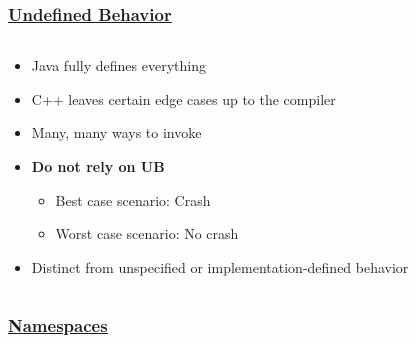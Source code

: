 \documentclass[glossy]{beamer}
\newcommand{\cppref}[2]{\href{http://en.cppreference.com/w/cpp/#1}{\underline{#2}}}
\newcommand{\refer}[1]{([shift={(.25em,.25em)}]pic cs:#1)}
\begin{document}

\begin{frame}[fragile=singleslide]
  \frametitle{\cppref{language/ub}{Undefined Behavior}}
  \begin{columns}
    \begin{column}{6cm}
      \begin{itemize}
        \item Java fully defines everything
        \item C++ leaves certain edge cases up to the compiler
        \item Many, many ways to invoke
        \item \textbf{Do not rely on UB}
        \begin{itemize}
          \item Best case scenario: Crash
          \item Worst case scenario: No crash
        \end{itemize}
        \item Distinct from unspecified or implementation-defined behavior
      \end{itemize}
    \end{column}

    \begin{column}{6cm}
    \end{column}
  \end{columns}
\end{frame}


\begin{frame}[fragile=singleslide]
  \frametitle{\cppref{language/namespace}{Namespaces}}


\end{frame}
\end{document}
